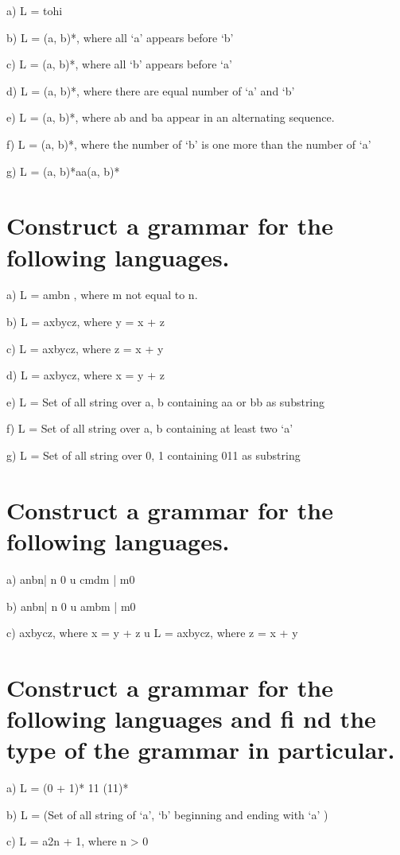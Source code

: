 \documentclass[]{article}
\begin{document}
a) L = {tohi}
 
 
 b) L = (a, b)*, where all ‘a’ appears before ‘b’
 
 
 c) L = (a, b)*, where all ‘b’ appears before ‘a’
 
 
 d) L = (a, b)*, where there are equal number of ‘a’ and ‘b’
 
 
 e) L = (a, b)*, where ab and ba appear in an alternating sequence.
 
 
 f) L = (a, b)*, where the number of ‘b’ is one more than the number of ‘a’


 g) L = (a, b)*aa(a, b)*

\section{Construct a grammar for the following languages.}

a) L = ambn
, where m not equal to n.


 b) L = axbycz, where y = x + z
 
 
 c) L = axbycz, where z = x + y
 
 
 d) L = axbycz, where x = y + z
 
 
 e) L = Set of all string over a, b containing aa or bb as substring
 
 
 f) L = Set of all string over a, b containing at least two ‘a’
 
 
 g) L = Set of all string over 0, 1 containing 011 as substring
 
 \section{Construct a grammar for the following languages.}
 
 
 a) { anbn| n 0} u {cmdm | m0 }


b) { anbn| n 0} u {ambm | m0 }
 
 c) { axbycz, where x = y + z } u { L = axbycz, where z = x + y}
 
 \section{Construct a grammar for the following languages and fi nd the type of the grammar in particular.}
 
 a) L = (0 + 1)* 11 (11)*
 
 
 b) L = (Set of all string of ‘a’, ‘b’ beginning and ending with ‘a’ )
 
 
 c) L = a2n + 1, where n > 0
\end{document}
